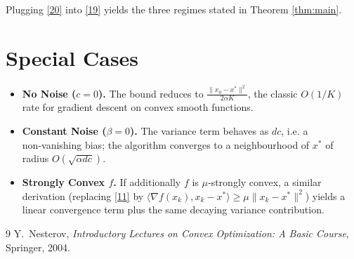 \documentclass{article}
\begin{document}
Plugging \eqref{20} into \eqref{19} yields the three regimes stated in Theorem \ref{thm:main}.

\section*{Special Cases}
\begin{itemize}
\item \textbf{No Noise ($c=0$).} The bound reduces to $\frac{\|x_{0}-x^{*}\|^{2}}{2\alpha K}$, the classic $O(1/K)$ rate for gradient descent on convex smooth functions.
\item \textbf{Constant Noise ($\beta=0$).} The variance term behaves as $d c$, i.e. a non‑vanishing bias; the algorithm converges to a neighbourhood of $x^{*}$ of radius $O(\sqrt{\alpha d c})$.
\item \textbf{Strongly Convex $f$.} If additionally $f$ is $\mu$‑strongly convex, a similar derivation (replacing \eqref{11} by $\langle\nabla f(x_{k}),x_{k}-x^{*}\rangle\ge \mu\|x_{k}-x^{*}\|^{2}$) yields a linear convergence term plus the same decaying variance contribution.
\end{itemize}

\begin{thebibliography}{9}
Y.~Nesterov, \emph{Introductory Lectures on Convex Optimization: A Basic Course}, Springer, 2004.
\end{thebibliography}
\end{document}
